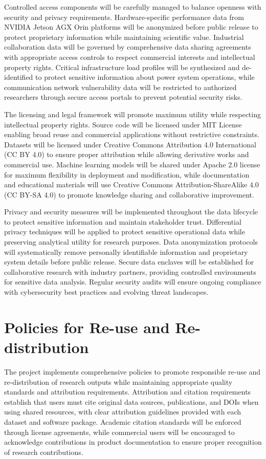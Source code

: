 \documentclass[12pt]{article}
\begin{document}
Controlled access components will be carefully managed to balance openness with security and privacy requirements. Hardware-specific performance data from NVIDIA Jetson AGX Orin platforms will be anonymized before public release to protect proprietary information while maintaining scientific value. Industrial collaboration data will be governed by comprehensive data sharing agreements with appropriate access controls to respect commercial interests and intellectual property rights. Critical infrastructure load profiles will be synthesized and de-identified to protect sensitive information about power system operations, while communication network vulnerability data will be restricted to authorized researchers through secure access portals to prevent potential security risks.

The licensing and legal framework will promote maximum utility while respecting intellectual property rights. Source code will be licensed under MIT License enabling broad reuse and commercial applications without restrictive constraints. Datasets will be licensed under Creative Commons Attribution 4.0 International (CC BY 4.0) to ensure proper attribution while allowing derivative works and commercial use. Machine learning models will be shared under Apache 2.0 license for maximum flexibility in deployment and modification, while documentation and educational materials will use Creative Commons Attribution-ShareAlike 4.0 (CC BY-SA 4.0) to promote knowledge sharing and collaborative improvement.

Privacy and security measures will be implemented throughout the data lifecycle to protect sensitive information and maintain stakeholder trust. Differential privacy techniques will be applied to protect sensitive operational data while preserving analytical utility for research purposes. Data anonymization protocols will systematically remove personally identifiable information and proprietary system details before public release. Secure data enclaves will be established for collaborative research with industry partners, providing controlled environments for sensitive data analysis. Regular security audits will ensure ongoing compliance with cybersecurity best practices and evolving threat landscapes.

\section{Policies for Re-use and Re-distribution}

The project implements comprehensive policies to promote responsible re-use and re-distribution of research outputs while maintaining appropriate quality standards and attribution requirements. Attribution and citation requirements establish that users must cite original data sources, publications, and DOIs when using shared resources, with clear attribution guidelines provided with each dataset and software package. Academic citation standards will be enforced through license agreements, while commercial users will be encouraged to acknowledge contributions in product documentation to ensure proper recognition of research contributions.
\end{document}
